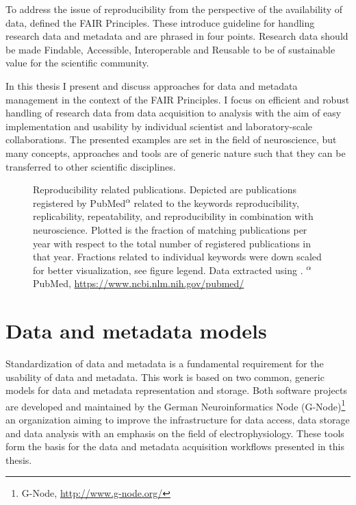 To address the issue of reproducibility from the perspective of the availability of data, \citet{Wilkinson_2016} defined the FAIR Principles. These introduce guideline for handling research data and metadata and are phrased in four points. Research data should be made Findable, Accessible, Interoperable and Reusable to be of sustainable value for the scientific community.

In this thesis I present and discuss approaches for data and metadata management in the context of the FAIR Principles. I focus on efficient and robust handling of research data from data acquisition to analysis with the aim of easy implementation and usability by individual scientist and laboratory-scale collaborations. The presented examples are set in the field of neuroscience, but many concepts, approaches and tools are of generic nature such that they can be transferred to other scientific disciplines. 


\begin{figure}
 \centering
 
 \caption[Reproducibility related publications]{Reproducibility related publications. Depicted  are publications registered by PubMed\textsuperscript{$\alpha$} related to the keywords reproducibility, replicability, repeatability, and reproducibility in combination with neuroscience. Plotted is the fraction of matching publications per year with respect to the total number of registered publications in that year. Fractions related to individual keywords were down scaled for better visualization, see figure legend. Data extracted using \citet{Corlan_2004}. \small\textsuperscript{$\alpha$} PubMed, \url{https://www.ncbi.nlm.nih.gov/pubmed/}}
 \label{fig:intro_reproducibility}
\end{figure}

\section{Data and metadata models}
Standardization of data and metadata is a fundamental requirement for the usability of data and metadata. This work is based on two common, generic models for data and metadata representation and storage. Both software projects are developed and maintained by the German Neuroinformatics Node (G-Node)\footnote{G-Node, \url{http://www.g-node.org/}} an organization aiming to improve the infrastructure for data access, data storage and data analysis with an emphasis on the field of electrophysiology. These tools form the basis for the data and metadata acquisition workflows presented in this thesis.

